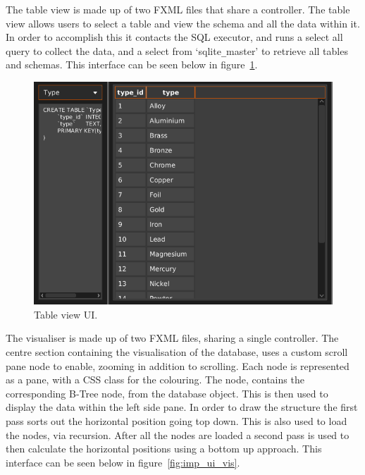 The table view is made up of two FXML files that share a controller. The table view allows users to select a  table and view the schema and all the data within it. In order to accomplish this it contacts the SQL executor, and runs a select all query to collect the data, and a select from `sqlite\verb|_|master' to retrieve all tables and schemas. This interface can be seen below in figure~\ref{fig:imp_ui_table}.

\begin{figure}[H]
	\centering
	\includegraphics[scale=0.32]{images/ui_table_final.png}
	\caption{Table view UI.}
	\label{fig:imp_ui_table}
\end{figure}

The visualiser is made up of two FXML files, sharing a single controller. The centre section containing the visualisation of the database, uses a custom scroll pane node to enable, zooming in addition to scrolling. Each node is represented as a pane, with a CSS class for the colouring. The node, contains the corresponding B-Tree node, from the database object. This is then used to display the data within the left side pane. In order to draw the structure the first pass sorts out the horizontal position going top down. This is also used to load the nodes, via recursion. After all the nodes are loaded a second pass is used to then calculate the horizontal positions using a bottom up approach. This interface can be seen below in figure~\ref{fig:imp_ui_vis}.

